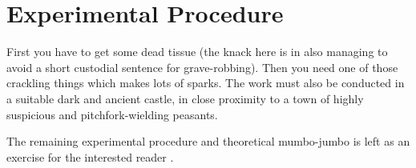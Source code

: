
\chapter{Experimental Procedure}

First you have to get some dead tissue (the knack here is in also managing to
avoid a short custodial sentence for grave-robbing). Then you need one of
those crackling things which makes lots of sparks. The work must also be
conducted in a suitable dark and ancient castle, in close proximity to a town
of highly suspicious and pitchfork-wielding peasants.

The remaining experimental procedure and theoretical mumbo-jumbo is left as an
exercise for the interested reader \citep{shelley-1818}.
